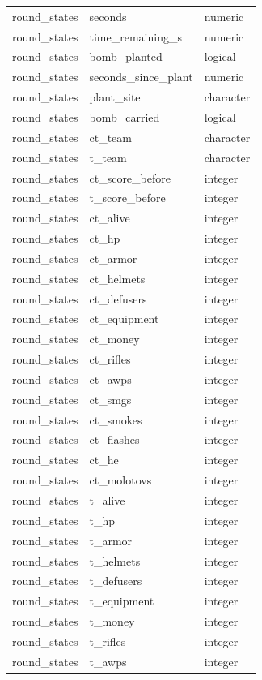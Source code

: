 \documentclass[
  letterpaper,
  DIV=11,
  numbers=noendperiod]{scrartcl}
\begin{document}
{\begin{longtable}[]{@{}lll@{}}
round\_states & seconds & numeric \\
round\_states & time\_remaining\_s & numeric \\
round\_states & bomb\_planted & logical \\
round\_states & seconds\_since\_plant & numeric \\
round\_states & plant\_site & character \\
round\_states & bomb\_carried & logical \\
round\_states & ct\_team & character \\
round\_states & t\_team & character \\
round\_states & ct\_score\_before & integer \\
round\_states & t\_score\_before & integer \\
round\_states & ct\_alive & integer \\
round\_states & ct\_hp & integer \\
round\_states & ct\_armor & integer \\
round\_states & ct\_helmets & integer \\
round\_states & ct\_defusers & integer \\
round\_states & ct\_equipment & integer \\
round\_states & ct\_money & integer \\
round\_states & ct\_rifles & integer \\
round\_states & ct\_awps & integer \\
round\_states & ct\_smgs & integer \\
round\_states & ct\_smokes & integer \\
round\_states & ct\_flashes & integer \\
round\_states & ct\_he & integer \\
round\_states & ct\_molotovs & integer \\
round\_states & t\_alive & integer \\
round\_states & t\_hp & integer \\
round\_states & t\_armor & integer \\
round\_states & t\_helmets & integer \\
round\_states & t\_defusers & integer \\
round\_states & t\_equipment & integer \\
round\_states & t\_money & integer \\
round\_states & t\_rifles & integer \\
round\_states & t\_awps & integer \\

\end{longtable}}
\end{document}
